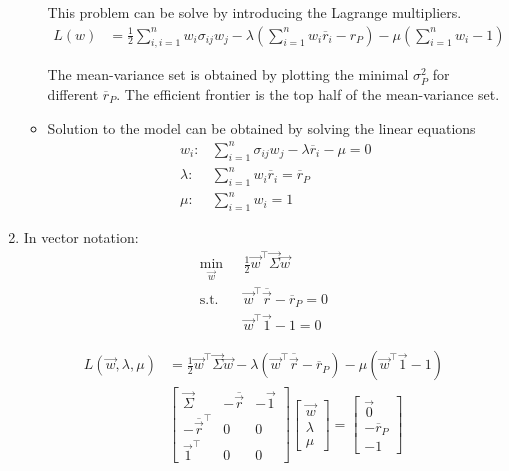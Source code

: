 \documentclass[12pt,twoside]{article}
\begin{document}
\begin{enumerate}
\begin{itemize}
	This problem can be solve by introducing the Lagrange multipliers.
	\begin{align*}
		L(w) & = \frac{1}{2}\sum_{i,i=1}^n w_i\sigma_{ij}w_j  - \lambda \left(\sum_{i=1}^n w_i\overline{r}_i - r_P\right) - \mu \left(\sum_{i=1}^n w_i - 1\right)
	\end{align*}
	
	The mean-variance set is obtained by plotting the minimal $\sigma_P^2$ for different $\overline{r}_P$. The efficient frontier is the top half of the mean-variance set.
	
	\item Solution to the model can be obtained by solving the linear equations
	\begin{align*}
			w_i:			&\sum_{i=1}^n \sigma_{ij}w_j - \lambda \overline{r}_i - \mu = 0\\
			\lambda:	&\sum_{i=1}^n w_i\overline{r}_i = \overline{r}_P\\
			\mu:			&\sum_{i=1}^n w_i = 1
	\end{align*}		
\end{itemize}

	\item In vector notation:
	\begin{align*}
			\min_{\vec{w}}	\text{  }	& \frac{1}{2}\vec{w}^\top\vec{\Sigma} \vec{w}\\
			\text{s.t.  	}						& \vec{w}^\top\overline{\vec{r}} - \overline{r}_P = 0\\
													&	\vec{w}^\top \vec{1} - 1 = 0
	\end{align*}
	
	\begin{align*}
		L(\vec{w}, \lambda, \mu) &= \frac{1}{2}\vec{w}^\top\vec{\Sigma} \vec{w} - \lambda \left(\vec{w}^\top\overline{\vec{r}} - \overline{r}_P \right) - \mu (\vec{w}^\top \vec{1} -1)\\
		&\begin{bmatrix}
			\vec{\Sigma}						& 	- \overline{\vec{r}}	& - \vec{1} \\
		 	- \overline{\vec{r}}^\top	& 0 								& 0\\
			\vec{1}^\top						& 0 								& 0
		\end{bmatrix}
		\begin{bmatrix}
		\vec{w}\\
		\lambda \\
		\mu
		\end{bmatrix}
		= \begin{bmatrix}
		\vec{0}		\\
		-\overline{r}_P\\
		-1
		\end{bmatrix}
	\end{align*}
	

\end{enumerate}
\end{document}
